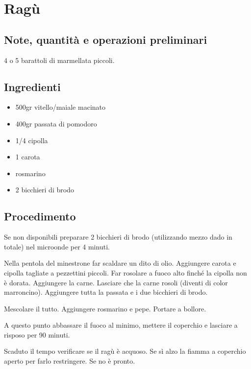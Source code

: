 \documentclass[12pt]{article}
\begin{document}
\newpage


\section{Ragù}

\subsection*{Note, quantità e operazioni preliminari}
4 o 5 barattoli di marmellata piccoli.

\bigskip
\bigskip

\begin{multicols}{2}
\subsection*{Ingredienti}
\begin{itemize}
	\item 500gr vitello/maiale macinato
	\item 400gr passata di pomodoro
	\item 1/4 cipolla
	\item 1 carota
	\item rosmarino
	\item 2 bicchieri di brodo
\end{itemize}

\vspace*{\fill}

\columnbreak
\subsection*{Procedimento}

Se non disponibili preparare 2 bicchieri di brodo (utilizzando
mezzo dado in totale) nel microonde per 4 minuti.
\medskip

Nella pentola del minestrone far scaldare un dito di olio.
Aggiungere carota e cipolla tagliate a pezzettini piccoli.
Far rosolare a fuoco alto finché la cipolla non è dorata.
Aggiungere la carne.
Lasciare che la carne rosoli (diventi di color marroncino).
Aggiungere tutta la passata e i due bicchieri di brodo.
\medskip

Mescolare il tutto. Aggiungere rosmarino e pepe.
Portare a bollore.
\medskip

A questo punto abbassare il fuoco al minimo, 
mettere il coperchio e lasciare a risposo per 90 minuti.
\medskip

Scaduto il tempo verificare se il ragù è acquoso.
Se sì alzo la fiamma a coperchio aperto per farlo restringere.
Se no è pronto.

\end{multicols}
\end{document}
